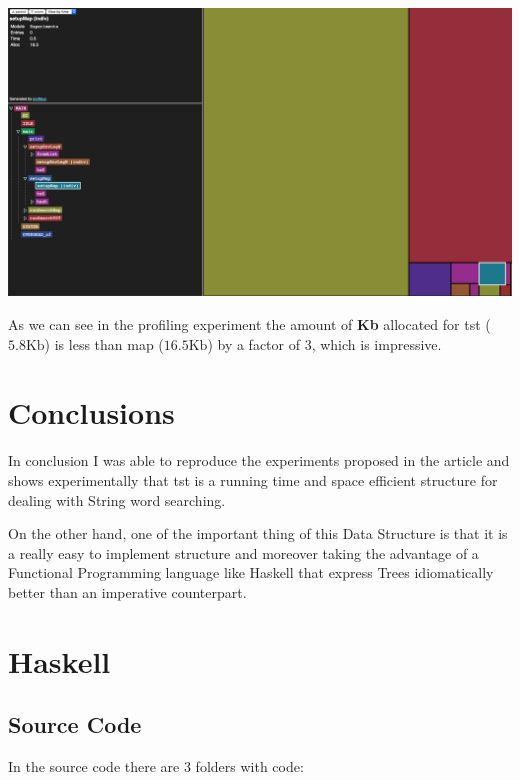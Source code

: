 \documentclass[12pt, a4paper]{article}
\begin{document}
\begin{minipage}[t]{\linewidth}
  \includegraphics[width=\textwidth]{alloc_hash}
  \captionsetup{type=figure}
  \label{fig:alloc_map}
\end{minipage}

As we can see in the profiling experiment the amount of \textbf{Kb} allocated for \acrshort{tst} ($5.8 \text{Kb}$)  is less than \acrshort{map} ($16.5 \text{Kb}$) by a factor of 3, which is impressive.

\section{Conclusions}
In conclusion I was able to reproduce the experiments proposed in the article and shows experimentally that \acrfull{tst} is a running time and space efficient structure for dealing with String word searching.

On the other hand, one of the important thing of this Data Structure is that it is a really easy to implement structure and moreover taking the advantage of a Functional Programming language like Haskell that express Trees idiomatically better than an imperative counterpart.





\printglossary[type=\acronymtype]

\appendix\label{apx:org}
\section{Haskell}
\subsection{Source Code}
In the source code there are 3 folders with code:
\end{document}
